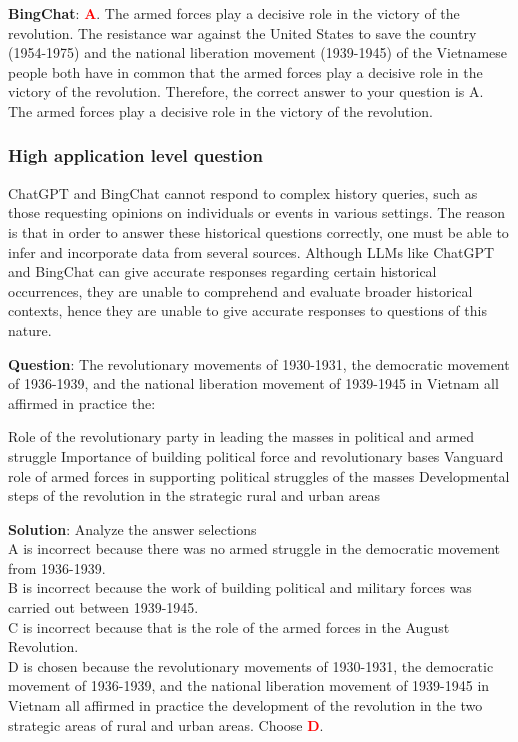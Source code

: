 \documentclass{article}
\begin{document}
{\begin{mdframed}[linewidth=1pt,linecolor=red]
		\textbf{BingChat}: \textcolor{red}{\textbf{A}}. The armed forces play a decisive role in the victory of the revolution. The resistance war against the United States to save the country (1954-1975) and the national liberation movement (1939-1945) of the Vietnamese people both have in common that the armed forces play a decisive role in the victory of the revolution. Therefore, the correct answer to your question is A. The armed forces play a decisive role in the victory of the revolution.
		
	\end{mdframed}
	
	
	\subsubsection{High application level question}
	\label{VNHSGE_His_H}
	
	ChatGPT and BingChat cannot respond to complex history queries, such as those requesting opinions on individuals or events in various settings. The reason is that in order to answer these historical questions correctly, one must be able to infer and incorporate data from several sources. Although LLMs like ChatGPT and BingChat can give accurate responses regarding certain historical occurrences, they are unable to comprehend and evaluate broader historical contexts, hence they are unable to give accurate responses to questions of this nature.
	
	\begin{mdframed}[linewidth=1pt,linecolor=red] \textbf{Question}: The revolutionary movements of 1930-1931, the democratic movement of 1936-1939, and the national liberation movement of 1939-1945 in Vietnam all affirmed in practice the:
		
		\begin{choices}
			\choice Role of the revolutionary party in leading the masses in political and armed struggle
			\choice Importance of building political force and revolutionary bases
			\choice Vanguard role of armed forces in supporting political struggles of the masses
			\choice Developmental steps of the revolution in the strategic rural and urban areas
		\end{choices}
		
		\textbf{Solution}: Analyze the answer selections\\
		A is incorrect because there was no armed struggle in the democratic movement from 1936-1939.\\
		B is incorrect because the work of building political and military forces was carried out between 1939-1945.\\
		C is incorrect because that is the role of the armed forces in the August Revolution.\\
		D is chosen because the revolutionary movements of 1930-1931, the democratic movement of 1936-1939, and the national liberation movement of 1939-1945 in Vietnam all affirmed in practice the development of the revolution in the two strategic areas of rural and urban areas. Choose \textcolor{red}{\textbf{D}}. 
		

\end{mdframed}}
\end{document}
